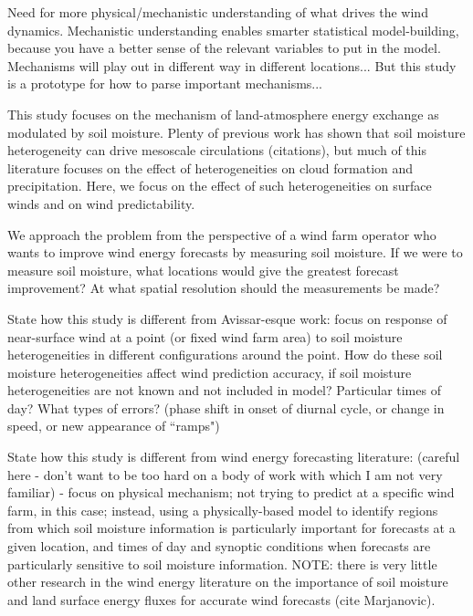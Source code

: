\documentclass[12pt]{amsart}
\begin{document}
Need for more physical/mechanistic understanding of what drives the wind dynamics.  Mechanistic understanding enables smarter statistical model-building, because you have a better sense of the relevant variables to put in the model.  Mechanisms will play out in different way in different locations... But this study is a prototype for how to parse important mechanisms...

This study focuses on the mechanism of land-atmosphere energy exchange as modulated by soil moisture.  Plenty of previous work has shown that soil moisture heterogeneity can drive mesoscale circulations (citations), but much of this literature focuses on the effect of heterogeneities on cloud formation and precipitation.  Here, we focus on the effect of such heterogeneities on surface winds and on wind predictability.  

We approach the problem from the perspective of a wind farm operator who wants to improve wind energy forecasts by measuring soil moisture.  If we were to measure soil moisture, what locations would give the greatest forecast improvement?  At what spatial resolution should the measurements be made?

State how this study is different from Avissar-esque work: focus on response of near-surface wind at a point (or fixed wind farm area) to soil moisture heterogeneities in different configurations around the point.  How do these soil moisture heterogeneities affect wind prediction accuracy, if soil moisture heterogeneities are not known and not included in model?  Particular times of day?  What types of errors?  (phase shift in onset of diurnal cycle, or change in speed, or new appearance of ``ramps")

State how this study is different from wind energy forecasting literature: (careful here - don't want to be too hard on a body of work with which I am not very familiar) - focus on physical mechanism; not trying to predict at a specific wind farm, in this case; instead, using a physically-based model to identify regions from which soil moisture information is particularly important for forecasts at a given location, and times of day and synoptic conditions when forecasts are particularly sensitive to soil moisture information.  NOTE: there is very little other research in the wind energy literature on the importance of soil moisture and land surface energy fluxes for accurate wind forecasts (cite Marjanovic).
\end{document}

